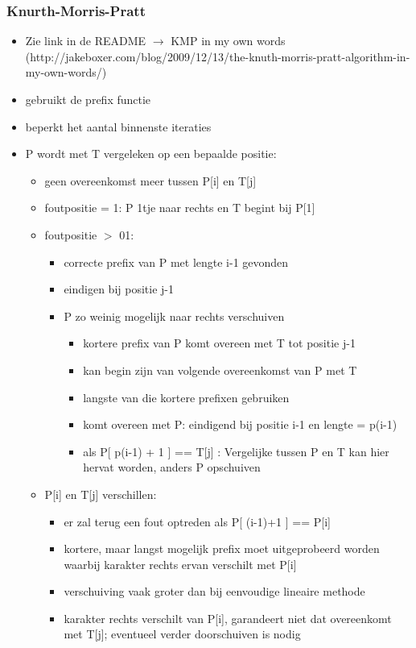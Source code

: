 \subsubsection{Knurth-Morris-Pratt}
\begin{itemize}
\item Zie link in de README $\rightarrow$ KMP in my own words (http://jakeboxer.com/blog/2009/12/13/the-knuth-morris-pratt-algorithm-in-my-own-words/)
\item gebruikt de prefix functie
\item beperkt het aantal binnenste iteraties 
\item P wordt met T vergeleken op een bepaalde positie:
\begin{itemize}
\item geen overeenkomst meer tussen P[i] en T[j]
\item foutpositie = 1: P 1tje naar rechts en T begint bij P[1]
\item foutpositie $>$ 01: 
\begin{itemize}
\item correcte prefix van P met lengte i-1 gevonden
\item eindigen bij positie j-1
\item P zo weinig mogelijk naar rechts verschuiven
\begin{itemize}
\item kortere prefix van P komt overeen met T tot positie j-1
\item kan begin zijn van volgende overeenkomst van P met T
\item langste van die kortere prefixen gebruiken
\item komt overeen met P: eindigend bij positie i-1 en lengte = p(i-1)
\item als P[ p(i-1) + 1 ] == T[j] : Vergelijke tussen P en T kan hier hervat worden, anders P opschuiven
\end{itemize}
\end{itemize}
\item P[i] en T[j] verschillen:
\begin{itemize}
\item er zal terug een fout optreden als P[ (i-1)+1 ] == P[i]
\item kortere, maar langst mogelijk prefix moet uitgeprobeerd worden waarbij karakter rechts ervan verschilt met P[i]
\item verschuiving vaak groter dan bij eenvoudige lineaire methode
\item karakter rechts verschilt van P[i], garandeert niet dat overeenkomt met T[j]; eventueel verder doorschuiven is nodig

\end{itemize}
\end{itemize}
\end{itemize}
